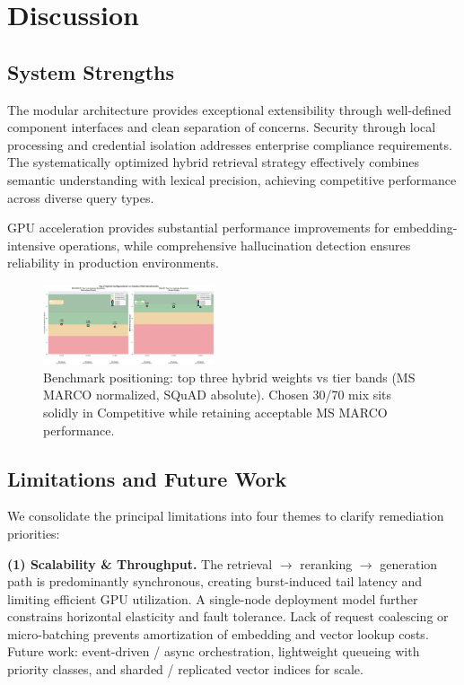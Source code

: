 \documentclass[conference]{IEEEtran}
\begin{document}
\section{Discussion}

\subsection{System Strengths}

The modular architecture provides exceptional extensibility through well-defined component interfaces and clean separation of concerns. Security through local processing and credential isolation addresses enterprise compliance requirements. The systematically optimized hybrid retrieval strategy effectively combines semantic understanding with lexical precision, achieving competitive performance across diverse query types.

GPU acceleration provides substantial performance improvements for embedding-intensive operations, while comprehensive hallucination detection ensures reliability in production environments.

\begin{figure}[htbp]
\centering
\begingroup
\captionsetup{font=small}
\includegraphics[width=0.45\textwidth]{images/evaluation_images/industry_benchmark_comparison.png}
\caption{Benchmark positioning: top three hybrid weights vs tier bands (MS MARCO normalized, SQuAD absolute). Chosen 30/70 mix sits solidly in Competitive while retaining acceptable MS MARCO performance.}
\label{fig:industry_benchmark}
\endgroup
\end{figure}

\subsection{Limitations and Future Work}

We consolidate the principal limitations into four themes to clarify remediation priorities:

    \textbf{(1) Scalability \& Throughput.} The retrieval $\rightarrow$ reranking $\rightarrow$ generation path is predominantly synchronous, creating burst-induced tail latency and limiting efficient GPU utilization. A single-node deployment model further constrains horizontal elasticity and fault tolerance. Lack of request coalescing or micro-batching prevents amortization of embedding and vector lookup costs. Future work: event-driven / async orchestration, lightweight queueing with priority classes, and sharded / replicated vector indices for scale.
\end{document}
